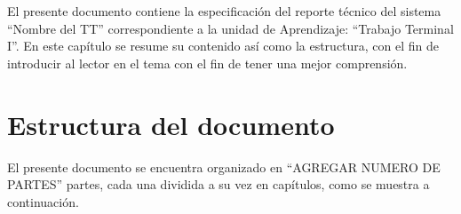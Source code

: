 \selectfont
	El presente documento contiene la especificación del reporte técnico del sistema ``Nombre del TT” correspondiente a la unidad de Aprendizaje: “Trabajo Terminal I''.
	En este capítulo se resume su contenido así como la estructura, con el fin de introducir al lector en el tema con el fin de 
	tener una mejor comprensión.

	
    \section{Estructura del documento}

       
	El presente documento se encuentra organizado en ``AGREGAR NUMERO DE PARTES'' partes, cada una dividida a su vez en capítulos, 
	como se muestra a continuación. \\


